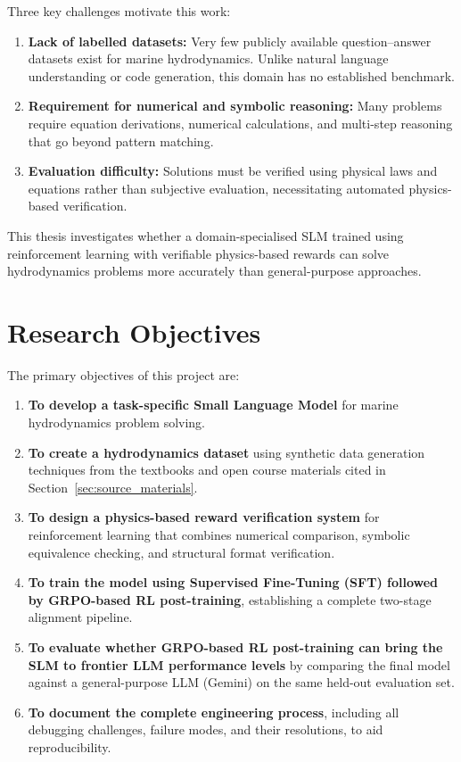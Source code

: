 \documentclass[12pt]{report}
\begin{document}
Three key challenges motivate this work:

\begin{enumerate}
    \item \textbf{Lack of labelled datasets:} Very few publicly available question--answer datasets exist for marine hydrodynamics. Unlike natural language understanding or code generation, this domain has no established benchmark.
    
    \item \textbf{Requirement for numerical and symbolic reasoning:} Many problems require equation derivations, numerical calculations, and multi-step reasoning that go beyond pattern matching.
    
    \item \textbf{Evaluation difficulty:} Solutions must be verified using physical laws and equations rather than subjective evaluation, necessitating automated physics-based verification.
\end{enumerate}

This thesis investigates whether a domain-specialised SLM trained using reinforcement learning with verifiable physics-based rewards can solve hydrodynamics problems more accurately than general-purpose approaches.

\section{Research Objectives}

The primary objectives of this project are:

\begin{enumerate}
    \item \textbf{To develop a task-specific Small Language Model} for marine hydrodynamics problem solving.
    
    \item \textbf{To create a hydrodynamics dataset} using synthetic data generation techniques from the textbooks and open course materials cited in Section~\ref{sec:source_materials}.
    
    \item \textbf{To design a physics-based reward verification system} for reinforcement learning that combines numerical comparison, symbolic equivalence checking, and structural format verification.
    
    \item \textbf{To train the model using Supervised Fine-Tuning (SFT) followed by GRPO-based RL post-training}, establishing a complete two-stage alignment pipeline.
    
    \item \textbf{To evaluate whether GRPO-based RL post-training can bring the SLM to frontier LLM performance levels} by comparing the final model against a general-purpose LLM (Gemini) on the same held-out evaluation set.
    
    \item \textbf{To document the complete engineering process}, including all debugging challenges, failure modes, and their resolutions, to aid reproducibility.
\end{enumerate}
\end{document}
